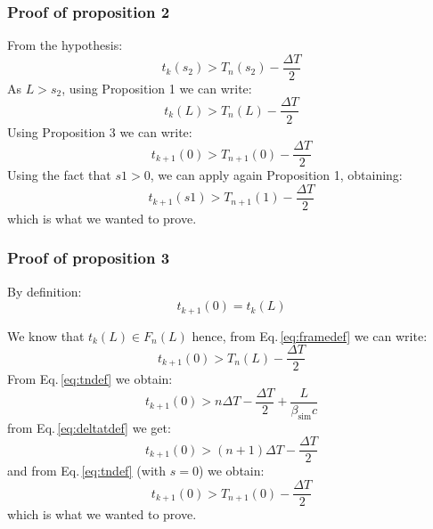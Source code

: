 \subsubsection*{Proof of proposition 2}

From the hypothesis:
\begin{equation}
t_{k}(s_2) > T_{n}(s_2) - \frac{\Delta T}{2}
\end{equation}
As $L>s_2$, using Proposition 1 we can write:
\begin{equation}
t_{k}(L) > T_{n}(L) - \frac{\Delta T}{2}
\end{equation}
Using Proposition 3 we can write:
\begin{equation}
t_{k+1}(0) > T_{n+1}(0) - \frac{\Delta T}{2}
\end{equation}
Using the fact that $s1>0$, we can apply again Proposition 1, obtaining:
\begin{equation}
t_{k+1}(s1) > T_{n+1}(1) - \frac{\Delta T}{2}
\end{equation}
which is what we wanted to prove.


\subsubsection*{Proof of proposition 3}

By definition:
\begin{equation}
t_{k+1}(0) = t_{k}(L)
\end{equation}

We know that $t_{k}(L) \in F_n(L)$ hence, from Eq.\,\ref{eq:framedef} we can write:
\begin{equation}
t_{k+1}(0) > T_n(L) - \frac{\Delta T}{2}
\end{equation}
From Eq.\,\ref{eq:tndef} we obtain:
\begin{equation}
t_{k+1}(0) > n \Delta T - \frac{\Delta T}{2} + \frac{L}{\beta_\text{sim}c}
\end{equation}
from Eq.\,\ref{eq:deltatdef} we get:
\begin{equation}
t_{k+1}(0) > (n+1) \Delta T - \frac{\Delta T}{2}
\end{equation}
and from Eq.\,\ref{eq:tndef} (with $s=0$) we obtain:\begin{equation}
t_{k+1}(0) > T_{n+1}(0) - \frac{\Delta T}{2}
\end{equation}
which is what we wanted to prove.


